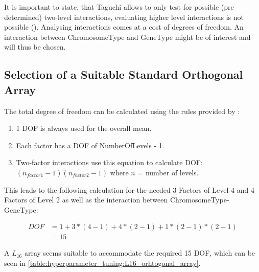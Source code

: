 It is important to state, that Taguchi allows to only test for possible (pre determined) two-level interactions, evaluating higher level interactions is not possible (\cite{yang_design_2009}). Analysing interactions comes at a cost of degrees of freedom. An interaction between ChromosomeType and GeneType might be of interest and will thus be chosen.

\subsection{Selection of a Suitable Standard Orthogonal Array}
\label{chap:hyperparameter_tuning:selection_orthogonal_array}
The total degree of freedom can be calculated using the rules provided by \cite{yang_design_2009}:

\begin{enumerate}
	\item 1 DOF is always used for the overall mean. 
	\item Each factor has a DOF of NumberOfLevels - 1.
	\item Two-factor interactions use this equation to calculate DOF: $(n_{factor1} - 1)(n_{factor2} - 1)$ where $n$ = number of levels.
\end{enumerate}

This leads to the following calculation for the needed 3 Factors of Level 4 and 4 Factors of Level 2 as well as the interaction between ChromosomeType-GeneType:

\begin{equation} \label{DOF}
	\begin{split}
		DOF & = 1 + 3 * (4 - 1) + 4 * (2 - 1) + 1 * (2 - 1) * (2 - 1) \\
		& = 15
	\end{split}
\end{equation}

A $L_{16}$ array seems suitable to accommodate the required 15 DOF, which can be seen in \ref{table:hyperparameter_tuning:L16_orhtogonal_array}.

